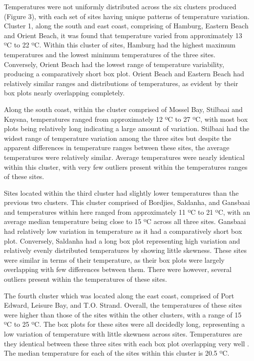 \documentclass[12pt,A4paper,]{article}
\begin{document}
Temperatures were not uniformly distributed across the six clusters
produced (Figure 3), with each set of sites having unique patterns of
temperature variation. Cluster 1, along the south and east coast,
comprising of Hamburg, Eastern Beach and Orient Beach, it was found that
temperature varied from approximately 13 ºC to 22 ºC. Within this
cluster of sites, Hamburg had the highest maximum temperatures and the
lowest minimum temperatures of the three sites. Conversely, Orient Beach
had the lowest range of temperature variability, producing a
comparatively short box plot. Orient Beach and Eastern Beach had
relatively similar ranges and distributions of temperatures, as evident
by their box plots nearly overlapping completely.

Along the south coast, within the cluster comprised of Mossel Bay,
Stilbaai and Knysna, temperatures ranged from approximately 12 ºC to 27
ºC, with most box plots being relatively long indicating a large amount
of variation. Stilbaai had the widest range of temperature variation
among the three sites but despite the apparent differences in
temperature ranges between these sites, the average temperatures were
relatively similar. Average temperatures were nearly identical within
this cluster, with very few outliers present within the temperatures
ranges of these sites.

Sites located within the third cluster had slightly lower temperatures
than the previous two clusters. This cluster comprised of Bordjies,
Saldanha, and Gansbaai and temperatures within here ranged from
approximately 11 ºC to 21 ºC, with an average median temperature being
close to 15 ºC across all three sites. Gansbaai had relatively low
variation in temperature as it had a comparatively short box plot.
Conversely, Saldanha had a long box plot representing high variation and
relatively evenly distributed temperatures by showing little skewness.
These sites were similar in terms of their temperature, as their box
plots were largely overlapping with few differences between them. There
were however, several outliers present within the temperatures of these
sites.

The fourth cluster which was located along the east coast, comprised of
Port Edward, Leisure Bay, and T.O. Strand. Overall, the temperatures of
these sites were higher than those of the sites within the other
clusters, with a range of 15 ºC to 25 ºC. The box plots for these sites
were all decidedly long, representing a low variation of temperature
with little skewness across sites. Temperatures are they identical
between these three sites with each box plot overlapping very well . The
median temperature for each of the sites within this cluster is 20.5 ºC.
\end{document}
